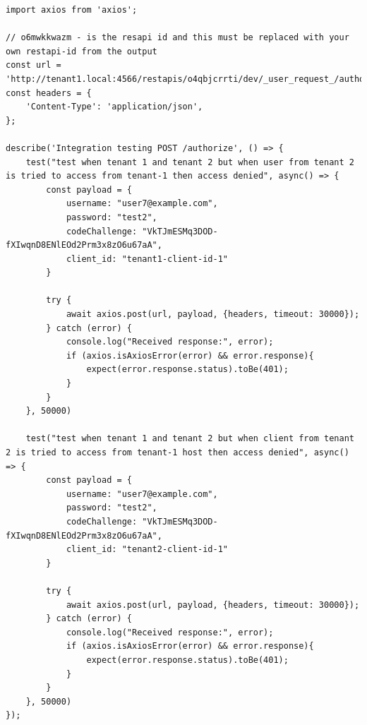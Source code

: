 \begin{lstlisting}[style=typescript,caption=Cross Tenant Data Leakage Integration Test ,label=apendix:cross_tenant_data_integ_test]
    import axios from 'axios';

// o6mwkkwazm - is the resapi id and this must be replaced with your own restapi-id from the output
const url = 'http://tenant1.local:4566/restapis/o4qbjcrrti/dev/_user_request_/authorize';
const headers = {
    'Content-Type': 'application/json',
};

describe('Integration testing POST /authorize', () => {
    test("test when tenant 1 and tenant 2 but when user from tenant 2 is tried to access from tenant-1 then access denied", async() => {
        const payload = {
            username: "user7@example.com",
            password: "test2",
            codeChallenge: "VkTJmESMq3DOD-fXIwqnD8ENlEOd2Prm3x8zO6u67aA",
            client_id: "tenant1-client-id-1"
        }

        try {
            await axios.post(url, payload, {headers, timeout: 30000});
        } catch (error) {
            console.log("Received response:", error);
            if (axios.isAxiosError(error) && error.response){
                expect(error.response.status).toBe(401);
            }
        }
    }, 50000)

    test("test when tenant 1 and tenant 2 but when client from tenant 2 is tried to access from tenant-1 host then access denied", async() => {
        const payload = {
            username: "user7@example.com",
            password: "test2",
            codeChallenge: "VkTJmESMq3DOD-fXIwqnD8ENlEOd2Prm3x8zO6u67aA",
            client_id: "tenant2-client-id-1"
        }

        try {
            await axios.post(url, payload, {headers, timeout: 30000});
        } catch (error) {
            console.log("Received response:", error);
            if (axios.isAxiosError(error) && error.response){
                expect(error.response.status).toBe(401);
            }
        }
    }, 50000)
});
\end{lstlisting}


